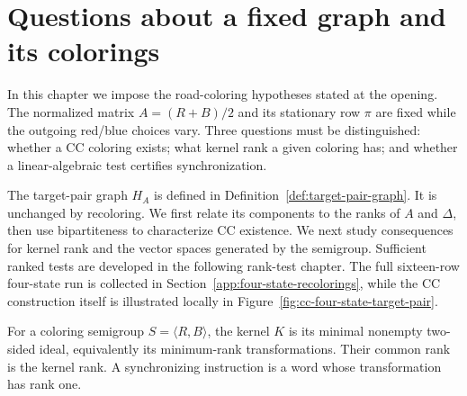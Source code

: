 \section{Questions about a fixed graph and its colorings}
\label{sec:5.1}
In this chapter we impose the road-coloring hypotheses stated at the
opening. The normalized matrix $A=(R+B)/2$ and its stationary row $\pi$
are fixed while the outgoing red/blue choices vary. Three questions must
be distinguished: whether a CC coloring exists; what kernel rank a given
coloring has; and whether a linear-algebraic test certifies synchronization.

The target-pair graph $H_A$ is defined in
Definition~\ref{def:target-pair-graph}. It is unchanged by recoloring.
We first relate its components to the ranks of $A$ and $\Delta$, then
use bipartiteness to characterize CC existence. We next study consequences
for kernel rank and the vector spaces generated by the semigroup.
Sufficient ranked tests are developed in the following rank-test chapter.
The full sixteen-row four-state run is collected in
Section~\ref{app:four-state-recolorings}, while the CC construction itself
is illustrated locally in Figure~\ref{fig:cc-four-state-target-pair}.

\begin{definition}\label{defn:5.1}
For a coloring semigroup $S=\langle R,B\rangle$, the kernel $K$ is its
minimal nonempty two-sided ideal, equivalently its minimum-rank
transformations. Their common rank is the kernel rank. A synchronizing
instruction is a word whose transformation has rank one.
\end{definition}
